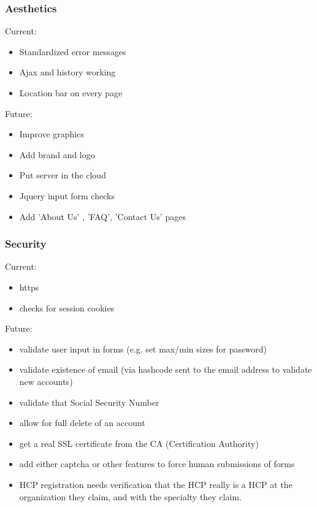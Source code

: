 \subsubsection{Aesthetics}
Current:
\begin{itemize}
\item Standardized error messages
\item Ajax and history working
\item Location bar on every page
\end{itemize}
Future: 
\begin{itemize}
\item Improve graphics
\item Add brand and logo
\item Put server in the cloud
\item Jquery input form checks
\item Add 'About Us' , 'FAQ', 'Contact Us' pages 
\end{itemize}

\subsubsection{Security}
Current:
\begin{itemize}
\item https
\item checks for session cookies
\end{itemize}
Future: 
\begin{itemize}
\item validate user input in forms (e.g. set max/min sizes for password)
\item validate existence of email (via hashcode sent to the email address to validate new accounts)
\item validate that Social Security Number
\item allow for full delete of an account
\item get a real SSL certificate from the CA (Certification Authority)
\item add either captcha or other features to force human submissions of forms
\item HCP registration needs verification that the HCP really is a HCP at the organization they claim, and with the specialty they claim. 
\end{itemize}

